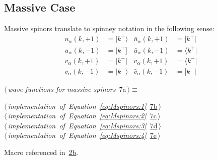 \documentclass[a4paper,12pt]{amsart}
\newcommand{\bra}[1]{\langle #1 \vert}
\newcommand{\brb}[1]{[ #1 \vert}
\newcommand{\kea}[1]{\vert #1 \rangle}
\newcommand{\keb}[1]{\vert #1 ]}
\renewcommand{\NWtarget}[2]{\hypertarget{#1}{#2}}
\renewcommand{\NWlink}[2]{\hyperlink{#1}{#2}}
\renewcommand{\NWtxtMacroRefIn}{Macro referenced in}
\renewcommand{\NWsep}{${\diamond}$}
\begin{document}
\subsection{Massive Case}
Massive spinors translate to spinney notation in the following
sense:
\begin{subequations}
\begin{align}
u_\alpha(k, +1) &= \kea{k^+} & \bar{u}_\alpha(k, +1) &= \brb{k^+}
\label{eq:Mspinors:1}\\
u_\alpha(k, -1) &= \keb{k^+} & \bar{u}_\alpha(k, -1) &= \bra{k^+}
\label{eq:Mspinors:2}\\
v_\alpha(k, +1) &= \keb{k^-} & \bar{v}_\alpha(k, +1) &= \bra{k^-}
\label{eq:Mspinors:3}\\
v_\alpha(k, -1) &= \kea{k^-} & \bar{v}_\alpha(k, -1) &= \brb{k^-}
\label{eq:Mspinors:4}
\end{align}
\end{subequations}
\begin{flushleft} \small
\begin{minipage}{\linewidth}\label{scrap13}\raggedright\small
\NWtarget{nuweb7a}{} $\langle\,${\itshape wave-functions for massive spinors}\nobreak\ {\footnotesize {7a}}$\,\rangle\equiv$
\vspace{-1ex}
\begin{list}{}{} \item
\mbox{}\verb@@\hbox{$\langle\,${\itshape implementation of Equation~\eqref{eq:Mspinors:1}}\nobreak\ {\footnotesize \NWlink{nuweb7b}{7b}}$\,\rangle$}\verb@@\\
\mbox{}\verb@@\hbox{$\langle\,${\itshape implementation of Equation~\eqref{eq:Mspinors:2}}\nobreak\ {\footnotesize \NWlink{nuweb7c}{7c}}$\,\rangle$}\verb@@\\
\mbox{}\verb@@\hbox{$\langle\,${\itshape implementation of Equation~\eqref{eq:Mspinors:3}}\nobreak\ {\footnotesize \NWlink{nuweb7d}{7d}}$\,\rangle$}\verb@@\\
\mbox{}\verb@@\hbox{$\langle\,${\itshape implementation of Equation~\eqref{eq:Mspinors:4}}\nobreak\ {\footnotesize \NWlink{nuweb7e}{7e}}$\,\rangle$}\verb@@{\NWsep}
\end{list}
\vspace{-1.5ex}
\footnotesize
\begin{list}{}{\setlength{\itemsep}{-\parsep}\setlength{\itemindent}{-\leftmargin}}
\item \NWtxtMacroRefIn\ \NWlink{nuweb2b}{2b}.

\item{}
\end{list}
\end{minipage}\vspace{4ex}
\end{flushleft}
\end{document}
